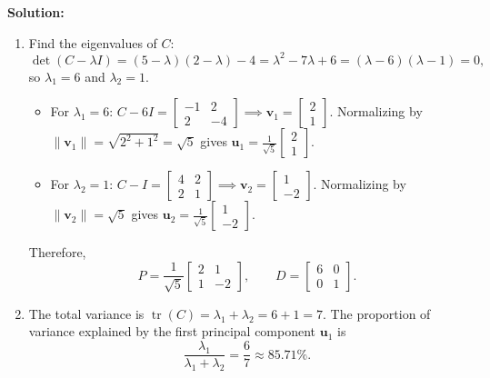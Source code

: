 \documentclass[11pt, letterpaper]{article}
\theoremstyle{definition}
\theoremstyle{remark}
\begin{document}
\textbf{Solution:}
\begin{enumerate}[label=(\alph*)]
    \item Find the eigenvalues of $C$:
    \[
    \det(C - \lambda I) = (5 - \lambda)(2 - \lambda) - 4 = \lambda^{2} - 7\lambda + 6 = (\lambda - 6)(\lambda - 1) = 0,
    \]
    so $\lambda_{1} = 6$ and $\lambda_{2} = 1$.
    \begin{itemize}
        \item For $\lambda_{1} = 6$: $C - 6I = \begin{bmatrix} -1 & 2 \\ 2 & -4 \end{bmatrix} \implies \mathbf{v}_{1} = \begin{bmatrix} 2 \\ 1 \end{bmatrix}$. Normalizing by $\|\mathbf{v}_{1}\| = \sqrt{2^{2}+1^{2}} = \sqrt{5}$ gives $\mathbf{u}_{1} = \frac{1}{\sqrt{5}}\begin{bmatrix} 2 \\ 1 \end{bmatrix}$.
        \item For $\lambda_{2} = 1$: $C - I = \begin{bmatrix} 4 & 2 \\ 2 & 1 \end{bmatrix} \implies \mathbf{v}_{2} = \begin{bmatrix} 1 \\ -2 \end{bmatrix}$. Normalizing by $\|\mathbf{v}_{2}\| = \sqrt{5}$ gives $\mathbf{u}_{2} = \frac{1}{\sqrt{5}}\begin{bmatrix} 1 \\ -2 \end{bmatrix}$.
    \end{itemize}
    Therefore,
    \[
    P = \frac{1}{\sqrt{5}}\begin{bmatrix} 2 & 1 \\ 1 & -2 \end{bmatrix}, \qquad D = \begin{bmatrix} 6 & 0 \\ 0 & 1 \end{bmatrix}.
    \]

    \item The total variance is $\operatorname{tr}(C) = \lambda_{1} + \lambda_{2} = 6 + 1 = 7$. The proportion of variance explained by the first principal component $\mathbf{u}_{1}$ is
    \[
    \frac{\lambda_{1}}{\lambda_{1} + \lambda_{2}} = \frac{6}{7} \approx 85.71\%.
    \]


\end{enumerate}
\end{document}

